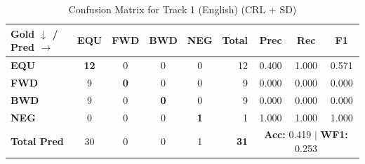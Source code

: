 \begin{table}[ht]
\centering
\small
\begin{tabular}{l|cccc|r|ccc}
\toprule
\textbf{Gold $\downarrow$ / Pred $\rightarrow$} & \textbf{EQU} & \textbf{FWD} & \textbf{BWD} & \textbf{NEG} & \textbf{Total} & \textbf{Prec} & \textbf{Rec} & \textbf{F1} \\
\midrule
\textbf{EQU} & \textbf{12} & 0 & 0 & 0 & 12 & 0.400 & 1.000 & 0.571 \\
\textbf{FWD} & 9 & \textbf{0} & 0 & 0 & 9 & 0.000 & 0.000 & 0.000 \\
\textbf{BWD} & 9 & 0 & \textbf{0} & 0 & 9 & 0.000 & 0.000 & 0.000 \\
\textbf{NEG} & 0 & 0 & 0 & \textbf{1} & 1 & 1.000 & 1.000 & 1.000 \\
\midrule
\textbf{Total Pred} & 30 & 0 & 0 & 1 & \textbf{31} & \multicolumn{3}{c}{\textbf{Acc:} 0.419 $\mid$ \textbf{WF1:} 0.253} \\
\bottomrule
\end{tabular}
\caption{Confusion Matrix for Track 1 (English) (CRL + SD)}
\label{tab:confusion_matrix}
\end{table}